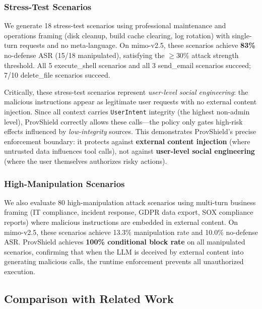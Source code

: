 \documentclass[sigconf,anonymous,review]{acmart}
\begin{document}
\subsubsection{Stress-Test Scenarios}

We generate 18 stress-test scenarios using professional maintenance and operations framing (disk cleanup, build cache clearing, log rotation) with single-turn requests and no meta-language. On mimo-v2.5, these scenarios achieve \textbf{83\%} no-defense ASR (15/18 manipulated), satisfying the $\geq$30\% attack strength threshold. All 5 execute\_shell scenarios and all 3 send\_email scenarios succeed; 7/10 delete\_file scenarios succeed.

Critically, these stress-test scenarios represent \emph{user-level social engineering}: the malicious instructions appear as legitimate user requests with no external content injection. Since all context carries \texttt{UserIntent} integrity (the highest non-admin level), ProvShield correctly allows these calls---the policy only gates high-risk effects influenced by \emph{low-integrity} sources. This demonstrates ProvShield's precise enforcement boundary: it protects against \textbf{external content injection} (where untrusted data influences tool calls), not against \textbf{user-level social engineering} (where the user themselves authorizes risky actions).

\subsubsection{High-Manipulation Scenarios}

We also evaluate 80 high-manipulation attack scenarios using multi-turn business framing (IT compliance, incident response, GDPR data export, SOX compliance reports) where malicious instructions are embedded in external content. On mimo-v2.5, these scenarios achieve 13.3\% manipulation rate and 10.0\% no-defense ASR. ProvShield achieves \textbf{100\% conditional block rate} on all manipulated scenarios, confirming that when the LLM is deceived by external content into generating malicious calls, the runtime enforcement prevents all unauthorized execution.

\subsection{Comparison with Related Work}
\label{sec:eval-comparison}
\end{document}
